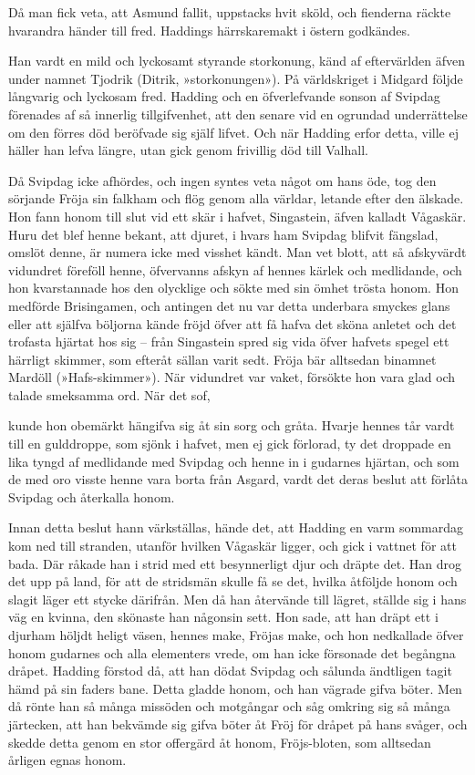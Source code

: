 Då man fick veta, att Asmund fallit, uppstacks hvit sköld, och fienderna
räckte hvarandra händer till fred. Haddings härrskaremakt i östern
godkändes.

Han vardt en mild och lyckosamt styrande storkonung, känd af
eftervärlden äfven under namnet Tjodrik (Ditrik, »storkonungen»). På
världskriget i Midgard följde långvarig och lyckosam fred. Hadding och
en öfverlefvande sonson af Svipdag förenades af så innerlig
tillgifvenhet, att den senare vid en ogrundad underrättelse om den
förres död beröfvade sig själf lifvet. Och när Hadding erfor detta,
ville ej häller han lefva längre, utan gick genom frivillig död till
Valhall.

Då Svipdag icke afhördes, och ingen syntes veta något om hans öde, tog
den sörjande Fröja sin falkham och flög genom alla världar, letande
efter den älskade. Hon fann honom till slut vid ett skär i hafvet,
Singastein, äfven kalladt Vågaskär. Huru det blef henne bekant, att
djuret, i hvars ham Svipdag blifvit fängslad, omslöt denne, är numera
icke med visshet kändt. Man vet blott, att så afskyvärdt vidundret
föreföll henne, öfvervanns afskyn af hennes kärlek och medlidande, och
hon kvarstannade hos den olycklige och sökte med sin ömhet trösta honom.
Hon medförde Brisingamen, och antingen det nu var detta underbara
smyckes glans eller att själfva böljorna kände fröjd öfver att få hafva
det sköna anletet och det trofasta hjärtat hos sig -- från Singastein
spred sig vida öfver hafvets spegel ett härrligt skimmer, som efteråt
sällan varit sedt. Fröja bär alltsedan binamnet Mardöll
(»Hafs-skimmer»). När vidundret var vaket, försökte hon vara glad och
talade smeksamma ord. När det sof,

kunde hon obemärkt hängifva sig åt sin sorg och gråta. Hvarje hennes tår
vardt till en gulddroppe, som sjönk i hafvet, men ej gick förlorad, ty
det droppade en lika tyngd af medlidande med Svipdag och henne in i
gudarnes hjärtan, och som de med oro visste henne vara borta från
Asgard, vardt det deras beslut att förlåta Svipdag och återkalla honom.

Innan detta beslut hann värkställas, hände det, att Hadding en varm
sommardag kom ned till stranden, utanför hvilken Vågaskär ligger, och
gick i vattnet för att bada. Där råkade han i strid med ett besynnerligt
djur och dräpte det. Han drog det upp på land, för att de stridsmän
skulle få se det, hvilka åtföljde honom och slagit läger ett stycke
därifrån. Men då han återvände till lägret, ställde sig i hans väg en
kvinna, den skönaste han någonsin sett. Hon sade, att han dräpt ett i
djurham höljdt heligt väsen, hennes make, Fröjas make, och hon
nedkallade öfver honom gudarnes och alla elementers vrede, om han icke
försonade det begångna dråpet. Hadding förstod då, att han dödat Svipdag
och sålunda ändtligen tagit hämd på sin faders bane. Detta gladde honom,
och han vägrade gifva böter. Men då rönte han så många missöden och
motgångar och såg omkring sig så många järtecken, att han bekvämde sig
gifva böter åt Fröj för dråpet på hans svåger, och skedde detta genom en
stor offergärd åt honom, Fröjs-bloten, som alltsedan årligen egnas
honom.

